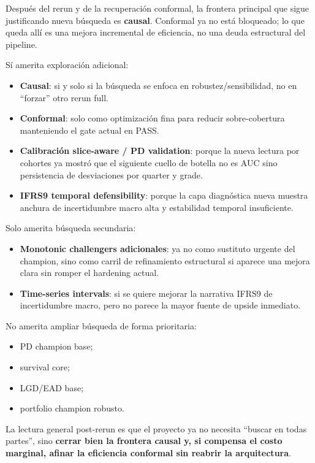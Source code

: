 \documentclass[
  spanish,
  11pt,
  letterpaper,
]{scrbook}
\providecommand{\tightlist}{%
  \setlength{\itemsep}{0pt}\setlength{\parskip}{0pt}}
\theoremstyle{plain}
\theoremstyle{remark}
\begin{document}
Después del rerun y de la recuperación conformal, la frontera principal
que sigue justificando nueva búsqueda es \textbf{causal}. Conformal ya
no está bloqueado; lo que queda allí es una mejora incremental de
eficiencia, no una deuda estructural del pipeline.

Sí amerita exploración adicional:

\begin{itemize}
\tightlist
\item
  \textbf{Causal}: si y solo si la búsqueda se enfoca en
  robustez/sensibilidad, no en ``forzar'' otro rerun full.
\item
  \textbf{Conformal}: solo como optimización fina para reducir
  sobre-cobertura manteniendo el gate actual en PASS.
\item
  \textbf{Calibración slice-aware / PD validation}: porque la nueva
  lectura por cohortes ya mostró que el siguiente cuello de botella no
  es AUC sino persistencia de desviaciones por quarter y grade.
\item
  \textbf{IFRS9 temporal defensibility}: porque la capa diagnóstica
  nueva muestra anchura de incertidumbre macro alta y estabilidad
  temporal insuficiente.
\end{itemize}

Solo amerita búsqueda secundaria:

\begin{itemize}
\tightlist
\item
  \textbf{Monotonic challengers adicionales}: ya no como sustituto
  urgente del champion, sino como carril de refinamiento estructural si
  aparece una mejora clara sin romper el hardening actual.
\item
  \textbf{Time-series intervals}: si se quiere mejorar la narrativa
  IFRS9 de incertidumbre macro, pero no parece la mayor fuente de upside
  inmediato.
\end{itemize}

No amerita ampliar búsqueda de forma prioritaria:

\begin{itemize}
\tightlist
\item
  PD champion base;
\item
  survival core;
\item
  LGD/EAD base;
\item
  portfolio champion robusto.
\end{itemize}

La lectura general post-rerun es que el proyecto ya no necesita ``buscar
en todas partes'', sino \textbf{cerrar bien la frontera causal y, si
compensa el costo marginal, afinar la eficiencia conformal sin reabrir
la arquitectura}.
\end{document}
